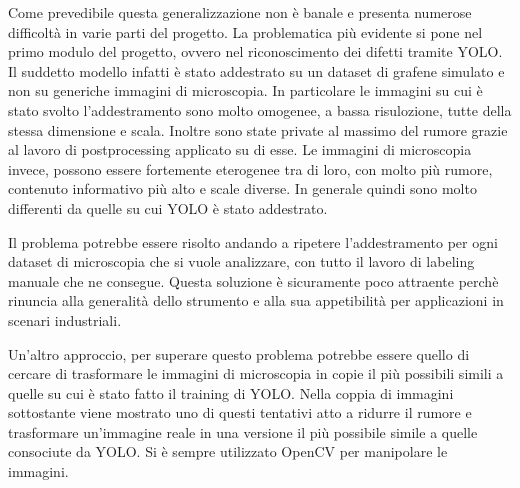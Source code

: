 \documentclass[12pt,a4paper,openright,twoside]{report}
\begin{document}
Come prevedibile questa generalizzazione non è banale e presenta numerose difficoltà in varie parti del progetto. 
La problematica più evidente si pone nel primo modulo del progetto, ovvero nel riconoscimento dei difetti tramite YOLO. Il suddetto modello infatti è stato addestrato su un dataset di grafene simulato e non su generiche immagini di microscopia. In particolare le immagini su cui è stato svolto l'addestramento sono molto omogenee, a bassa risulozione, tutte della stessa dimensione e scala. Inoltre sono state private al massimo del rumore grazie al lavoro di postprocessing applicato su di esse. Le immagini di microscopia invece, possono essere fortemente eterogenee tra di loro, con molto più rumore, contenuto informativo più alto e scale diverse. In generale quindi sono molto differenti da quelle su cui YOLO è stato addestrato.

Il problema potrebbe essere risolto andando a ripetere l'addestramento per ogni dataset di microscopia che si vuole analizzare, con tutto il lavoro di labeling manuale che ne consegue. Questa soluzione è sicuramente poco attraente perchè rinuncia alla generalità dello strumento e alla sua appetibilità per applicazioni in scenari industriali.

Un'altro approccio, per superare questo problema potrebbe essere quello di cercare di trasformare le immagini di microscopia in copie il più possibili simili a quelle su cui è stato fatto il training di YOLO. 
Nella coppia di immagini sottostante viene mostrato uno di questi tentativi atto a ridurre il rumore e trasformare un'immagine reale in una versione il più possibile simile a quelle consociute da YOLO. Si è sempre utilizzato OpenCV per manipolare le immagini.  
\end{document}
